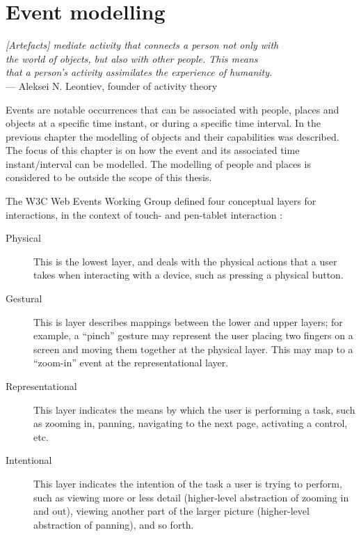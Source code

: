\chapter{Event modelling}
\label{EventModelling}

\begin{flushright}{\slshape    
[Artefacts] mediate activity that connects a person not only with \\
 the world of objects, but also with other people. This means \\
that a person's activity assimilates the experience of humanity.} \\ \medskip
    ---  Aleksei N. Leontiev, founder of activity theory
\end{flushright}


Events are notable occurrences that can be associated with people, places and objects at a specific time instant, or during a specific time interval. In the previous chapter the modelling of objects and their capabilities was described. The focus of this chapter is on how the event and its associated time instant/interval can be modelled. The modelling of people and places is considered to be outside the scope of this thesis.



The W3C Web Events Working Group defined four conceptual layers for interactions, in the context of touch- and pen-tablet interaction \cite{w3cevents}:

\begin{description}
\item [Physical] This is the lowest layer, and deals with the physical actions that a user takes when interacting with a device, such as pressing a physical button.
\item [Gestural] This is layer describes mappings between the lower and upper layers; for example, a ``pinch'' gesture may represent the user placing two fingers on a screen and moving them together at the physical layer. This may map to a ``zoom-in'' event at the representational layer.
\item [Representational] This layer indicates the means by which the user is performing a task, such as zooming in, panning, navigating to the next page, activating a control, etc.
\item [Intentional] This layer indicates the intention of the task a user is trying to perform, such as viewing more or less detail (higher-level abstraction of zooming in and out), viewing another part of the larger picture (higher-level abstraction of panning), and so forth.
\end{description}


